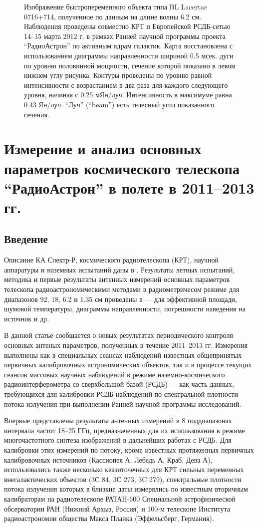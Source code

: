 \begin{figure}[]
{ }
 \caption{Изображение быстропеременного объекта типа BL Lacertae 0716+714, полученное
по данным на длине волны 6.2 см. Наблюдения проведены совместно КРТ и Европейской
РСДБ-сетью 14--15 марта 2012 г. в рамках Ранней научной программы проекта
``РадиоАстрон'' по активным ядрам галактик. Карта восстановлена
с использованием диаграммы направленности шириной 0.5 мсек. дуги
по уровню половинной мощности, сечение которой показано в левом нижнем углу
рисунка.  Контуры проведены по уровню равной интенсивности с
возрастанием в два раза для каждого следующего уровня, начиная с 0.25 мЯн/луч.
Интенсивность в максимуме равна 0.43 Ян/луч. ``Луч'' (``beam'') есть телесный
угол показанного сечения.}
 \label{fig:map_0716}
\end{figure}


\section{Измерение и анализ основных параметров космического телескопа ``РадиоАстрон'' в полете в
2011--2013 гг.}

\subsection{Введение}

Описание КА Спектр-Р, космического радиотелескопа (КРТ), научной аппаратуры и наземных испытаний
даны в \cite{Khartov_2011,Alexandrov_2011a,Alexandrov_2011b}. Результаты летных испытаний, методика
и первые результаты антенных измерений основных параметров телескопа радиоастрономическими методами
в радиометричесом режиме для диапазонов 92, 18, 6.2 и 1.35 см приведены в
\cite{Avdeev_2012,Kardashev_2013_rus,RAUH} --- для эффективной площади, шумовой температуры,
диаграммы направленности, погрешности наведения на источник и др.

В данной статье сообщается о новых результатах периодического контроля основных
антеных параметров, полученных в течение 2011--2013 гг. Измерения выполнены  как
в специальных сеансах наблюдений известных общепринятых первичных калибровочных
астрономических объектов, так и в процессе текущих сеансов массовых научных
наблюдений в режиме наземно-космического радиоинтерферометра со сверхбольшой
базой (РСДБ) --- как часть данных, требующихся для калибровки РСДБ наблюдений по
спектральной плотности потока излучения при выполнении Ранней научной программы
исследований.

Впервые представлены результаты антенных измерений в 8 поддиапазонах интервала частот 18--25 ГГц,
предназначенных для их использования в режиме многочастотного синтеза изображений в дальнейших
работах с РСДБ. Для калибровки этих измерений по потоку, кроме известных протяженных первичных
калибровочных источников (Кассиопея А, Лебедь А, Краб, Дева А), использовались также несколько
квазиточечных для КРТ сильных переменных внегалактических объектов (3С 84, 3С 273, 3C 279),
спектральные плотности потока излучения которых в близкие даты измерялись по известным вторичным
калибраторам на радиотелескопе РАТАН-600 Специальной астрофизической обсерватории РАН (Нижний Архыз,
Россия) и 100-м телескопе Института радиоастрономии общества Макса Планка (Эффельсберг, Германия).


